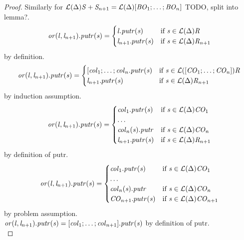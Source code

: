 \begin{lemma}
\begin{proof}
Similarly for
$\mathcal{L}(\Delta){\mathit{S}+\mathit{S}_{n+1}}
= \mathcal{L}(\Delta){[\mathit{BO}_1; \ldots ; \mathit{BO}_n]}$ TODO, split into lemma?.\\
\[
\mathit{or}(\mathit{l},\mathit{l}_{n+1}).\mathit{putr}(\mathit{s}) =
  \begin{cases}
    \mathit{l}.\mathit{putr}(\mathit{s})& \text{if } \mathit{s} \in \mathcal{L}(\Delta){\mathit{R}}\\
    \mathit{l}_{n+1}.putr(\mathit{s})& \text{if } \mathit{s} \in \mathcal{L}(\Delta){\mathit{R}_{n+1}}
  \end{cases}
\] by definition.\\
\[
\mathit{or}(\mathit{l},\mathit{l}_{n+1}).\mathit{putr}(\mathit{s}) =
  \begin{cases}
    [\mathit{col}_1;\ldots;\mathit{col}_n.\mathit{putr}(\mathit{s})& \text{if } \mathit{s} \in \mathcal{L}([\mathit{CO}_1 ; \ldots ; \mathit{CO}_n]){\mathit{R}}\\
    \mathit{l}_{n+1}.putr(\mathit{s})& \text{if } \mathit{s} \in \mathcal{L}(\Delta){\mathit{R}_{n+1}}
  \end{cases}
\] by induction assumption.\\
\[
\mathit{or}(\mathit{l},\mathit{l}_{n+1}).\mathit{putr}(\mathit{s}) =
  \begin{cases}
    \mathit{col}_1.\mathit{putr}(\mathit{s})& \text{if } \mathit{s} \in \mathcal{L}(\Delta){\mathit{CO}_1}\\
\ldots \\
    \mathit{col}_n(\mathit{s}).\mathit{putr}& \text{if } \mathit{s} \in \mathcal{L}(\Delta){\mathit{CO}_n}\\
    \mathit{l}_{n+1}.putr(\mathit{s})& \text{if } \mathit{s} \in \mathcal{L}(\Delta){\mathit{R}_{n+1}}
  \end{cases}
\] by definition of putr.\\
\[
\mathit{or}(\mathit{l},\mathit{l}_{n+1}).\mathit{putr}(\mathit{s}) =
  \begin{cases}
    \mathit{col}_1.\mathit{putr}(\mathit{s})& \text{if } \mathit{s} \in \mathcal{L}(\Delta){\mathit{CO}_1}\\
\ldots \\
    \mathit{col}_n(\mathit{s}).\mathit{putr}& \text{if } \mathit{s} \in \mathcal{L}(\Delta){\mathit{CO}_n}\\
    \mathit{CO}_{n+1}.putr(\mathit{s})& \text{if } \mathit{s} \in \mathcal{L}(\Delta){\mathit{CO}_{n+1}}
  \end{cases}
\] by problem assumption.\\
$\mathit{or}(\mathit{l},\mathit{l}_{n+1}).\mathit{putr}(\mathit{s}) =
[\mathit{col}_1; \ldots ; \mathit{col}_{n+1}].\mathit{putr}(\mathit{s})$ by definition of putr.\\
\end{proof}
\end{lemma}

